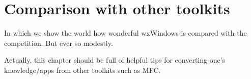 \chapter{Comparison with other toolkits}\label{chapcomparison}
%
%
\setfooter{\thepage}{}{}{}{}{\thepage}%

In which we show the world how wonderful wxWindows is compared with the competition. But ever so modestly.

Actually, this chapter should be full of helpful tips for converting one's knowledge/apps from other toolkits
such as MFC.

